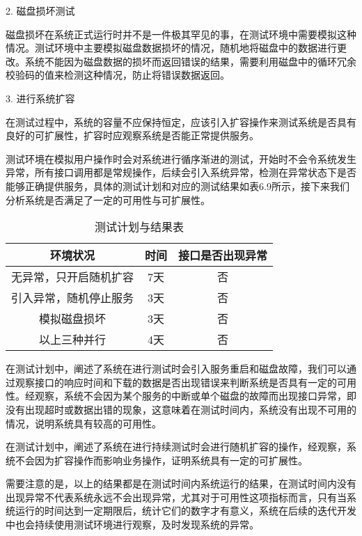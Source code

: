2. 磁盘损坏测试

磁盘损坏在系统正式运行时并不是一件极其罕见的事，在测试环境中需要模拟这种情况。测试环境中主要模拟磁盘数据损坏的情况，随机地将磁盘中的数据进行更改。系统不能因为磁盘数据的损坏而返回错误的结果，需要利用磁盘中的循环冗余校验码的值来检测这种情况，防止将错误数据返回。

3. 进行系统扩容

在测试过程中，系统的容量不应保持恒定，应该引入扩容操作来测试系统是否具有良好的可扩展性，扩容时应观察系统是否能正常提供服务。

测试环境在模拟用户操作时会对系统进行循序渐进的测试，开始时不会令系统发生异常，所有接口调用都是常规操作，后续会引入系统异常，检测在异常状态下是否能够正确提供服务，具体的测试计划和对应的测试结果如表6.9所示，接下来我们分析系统是否满足了一定的可用性与可扩展性。

\begin{table}[h]
    \centering
    \vspace{10pt}
    \caption{测试计划与结果表}
    \vspace{-15pt}
    \begin{tabular}{ccc}
      \toprule
      环境状况   & 时间   & 接口是否出现异常 \\
      \midrule
      无异常，只开启随机扩容  & 7天  & 否  \\
      引入异常，随机停止服务  & 3天  & 否  \\
      模拟磁盘损坏          & 3天  & 否   \\
      以上三种并行          & 4天  & 否   \\
      \bottomrule
    \end{tabular}
\end{table}

在测试计划中，阐述了系统在进行测试时会引入服务重启和磁盘故障，我们可以通过观察接口的响应时间和下载的数据是否出现错误来判断系统是否具有一定的可用性。经观察，系统不会因为某个服务的中断或单个磁盘的故障而出现接口异常，即没有出现超时或数据出错的现象，这意味着在测试时间内，系统没有出现不可用的情况，说明系统具有较高的可用性。

在测试计划中，阐述了系统在进行持续测试时会进行随机扩容的操作，经观察，系统不会因为扩容操作而影响业务操作，证明系统具有一定的可扩展性。

需要注意的是，以上的结果都是在测试时间内系统运行的结果，在测试时间内没有出现异常不代表系统永远不会出现异常，尤其对于可用性这项指标而言，只有当系统运行的时间达到一定期限后，统计它们的数字才有意义，系统在后续的迭代开发中也会持续使用测试环境进行观察，及时发现系统的异常。

